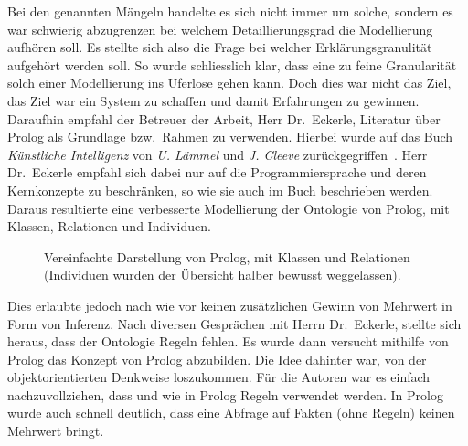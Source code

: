 Bei den genannten Mängeln handelte es sich nicht immer um solche, sondern es war schwierig abzugrenzen bei welchem Detaillierungsgrad die Modellierung aufhören soll. Es stellte sich also die Frage bei welcher Erklärungsgranulität aufgehört werden soll. So wurde schliesslich klar, dass eine zu feine Granularität solch einer Modellierung ins Uferlose gehen kann. Doch dies war nicht das Ziel, das Ziel war ein System zu schaffen und damit Erfahrungen zu gewinnen. Daraufhin empfahl der Betreuer der Arbeit, Herr Dr.\ Eckerle, Literatur über Prolog als Grundlage bzw.\ Rahmen zu verwenden. Hierbei wurde auf das Buch \textit{Künstliche Intelligenz} von \textit{U. Lämmel} und \textit{J. Cleeve} zurückgegriffen~\cite{laemmel}. Herr Dr.\ Eckerle empfahl sich dabei nur auf die Programmiersprache und deren Kernkonzepte zu beschränken, so wie sie auch im Buch beschrieben werden. Daraus resultierte eine verbesserte Modellierung der Ontologie von Prolog, mit Klassen, Relationen und Individuen.

\begin{figure}[H]
\centering {}
\caption{Vereinfachte Darstellung von Prolog, mit Klassen und Relationen (Individuen wurden der Übersicht halber bewusst weggelassen).\label{fig:prolog_baum}\protect\footnotemark}
\end{figure}

Dies erlaubte jedoch nach wie vor keinen zusätzlichen Gewinn von Mehrwert in Form von Inferenz. Nach diversen Gesprächen mit Herrn Dr.\ Eckerle, stellte sich heraus, dass der Ontologie Regeln fehlen. Es wurde dann versucht mithilfe von Prolog das Konzept von Prolog abzubilden. Die Idee dahinter war, von der objektorientierten Denkweise loszukommen. Für die Autoren war es einfach nachzuvollziehen, dass und wie in Prolog Regeln verwendet werden. In Prolog wurde auch schnell deutlich, dass eine Abfrage auf Fakten (ohne Regeln) keinen Mehrwert bringt.

